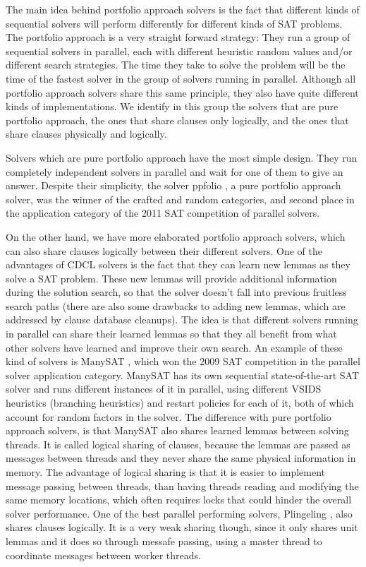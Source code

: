 \documentclass[12pt]{diicc}
\begin{document}
The main idea behind portfolio approach solvers is the fact that different kinds of sequential solvers will perform differently for different kinds of SAT problems. The portfolio approach is a very straight forward strategy: They run a group of sequential solvers in parallel, each with different heuristic random values and/or different search strategies. The time they take to solve the problem will be the time of the fastest solver in the group of solvers running in parallel. Although all portfolio approach solvers share this same principle, they also have quite different kinds of implementations. We identify in this group the solvers that are pure portfolio approach, the ones that share clauses only logically, and the ones that share clauses physically and logically.

Solvers which are pure portfolio approach have the most simple design. They run completely independent solvers in parallel and wait for one of them to give an answer. Despite their simplicity, the solver ppfolio \cite{ppfolio}, a pure portfolio approach solver, was the winner of the crafted and random categories, and second place in the application category of the 2011 SAT competition of parallel solvers. 

On the other hand, we have more elaborated portfolio approach solvers, which can also share clauses logically between their different solvers. One of the advantages of CDCL solvers is the fact that they can learn new lemmas as they solve a SAT problem. These new lemmas will provide additional information during the solution search, so that the solver doesn't fall into previous fruitless search paths (there are also some drawbacks to adding new lemmas, which are addressed by clause database cleanups). The idea is that different solvers running in parallel can share their learned lemmas so that they all benefit from what other solvers have learned and improve their own search. An example of these kind of solvers is ManySAT \cite{manysat}, which won the 2009 SAT competition in the parallel solver application category. ManySAT has its own sequential state-of-the-art SAT solver and runs different instances of it in parallel, using different VSIDS \cite{vsids} heuristics (branching heuristics) and restart policies for each of it, both of which account for random factors in the solver. The difference with pure portfolio approach solvers, is that ManySAT also shares learned lemmas between solving threads. It is called logical sharing of clauses, because the lemmas are passed as messages between threads and they never share the same physical information in memory. The advantage of logical sharing is that it is easier to implement message passing between threads, than having threads reading and modifying the same memory locations, which often requires locks that could hinder the overall solver performance. One of the best parallel performing solvers, Plingeling \cite{plingeling}, also shares clauses logically. It is a very weak sharing though, since it only shares unit lemmas and it does so through messafe passing, using a master thread to coordinate messages between worker threads. 
\end{document}
